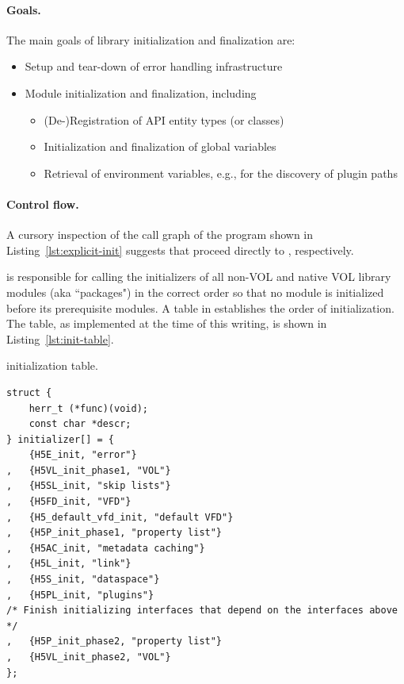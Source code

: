 \paragraph{Goals.} The main goals of library initialization and finalization are:

\begin{itemize}
    \item Setup and tear-down of error handling infrastructure
    \item Module initialization and finalization, including
    \begin{itemize}
        \item (De-)Registration of API entity types (or classes)
        \item Initialization and finalization of global variables
        \item Retrieval of environment variables, e.g., for the discovery of plugin paths
    \end{itemize}
\end{itemize}

\paragraph{Control flow.} A cursory inspection of the call graph of the program shown in Listing~\ref{lst:explicit-init} suggests that  proceed directly to , respectively.

 is responsible for calling the initializers of all non-VOL and native VOL library modules (aka ``packages") in the correct order so that no module is initialized before its prerequisite modules. A table in  establishes the order of initialization. The table, as implemented at the time of this writing, is shown in Listing~\ref{lst:init-table}.

\begin{listing}
\centering
\caption{ initialization table.}
\label{lst:init-table}
\begin{verbatim}
struct {
    herr_t (*func)(void);
    const char *descr;
} initializer[] = {
    {H5E_init, "error"}
,   {H5VL_init_phase1, "VOL"}
,   {H5SL_init, "skip lists"}
,   {H5FD_init, "VFD"}
,   {H5_default_vfd_init, "default VFD"}
,   {H5P_init_phase1, "property list"}
,   {H5AC_init, "metadata caching"}
,   {H5L_init, "link"}
,   {H5S_init, "dataspace"}
,   {H5PL_init, "plugins"}
/* Finish initializing interfaces that depend on the interfaces above */
,   {H5P_init_phase2, "property list"}
,   {H5VL_init_phase2, "VOL"}
};
\end{verbatim}
\end{listing}

